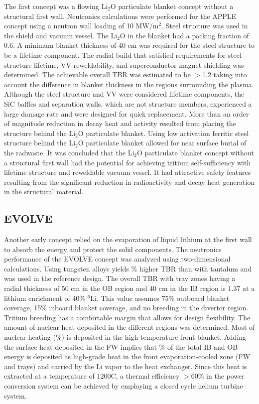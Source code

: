 The first concept was a flowing Li$_2$O particulate blanket concept without a
structural first wall.  Neutronics calculations were performed for the
\gls{APPLE} concept using a neutron wall loading of 10 MW/m$^2$. Steel
structure was used in the shield and vacuum vessel. The Li$_2$O in the blanket
had a packing fraction of 0.6. A minimum blanket thickness of 40 cm was
required for the steel structure to be a lifetime component. The radial build
that satisfied requirements for steel structure lifetime, \gls{VV} reweldability,
and superconductor magnet shielding was determined. The achievable overall TBR
was estimated to be $>$1.2 taking into account the difference in blanket
thickness in the regions surrounding the plasma. Although the steel structure
and \gls{VV} were considered lifetime components, the SiC baffles and separation
walls, which are not structure members, experienced a large damage rate and
were designed for quick replacement. More than an order of magnitude reduction
in decay heat and activity resulted from placing the structure behind the
Li$_2$O particulate blanket. Using low activation ferritic steel structure
behind the Li$_2$O particulate blanket allowed for near surface burial of the
radwaste.  It was concluded that the Li$_2$O particulate blanket concept
without a structural first wall had the potential for achieving tritium
self-sufficiency with lifetime structure and reweldable vacuum vessel.  It had
attractive safety features resulting from the significant reduction in
radioactivity and decay heat generation in the structural
material.

\subsection{\acrfull{EVOLVE}}

Another early concept relied on the evaporation of liquid lithium at the first
wall to absorb the energy and protect the solid components.  The neutronics
performance of the EVOLVE concept was analyzed using two-dimensional
calculations. Using tungsten alloys yields \% higher TBR than
with tantalum and was used in the reference design. The overall TBR with tray
zones having a radial thickness of 50 cm in the \gls{OB} region and 40 cm in
the \gls{IB} region is 1.37 at a lithium enrichment of 40\% $^6$Li. This value
assumes 75\% outboard blanket coverage, 15\% inboard blanket coverage, and no
breeding in the divertor region. Tritium breeding has a comfortable margin
that allows for design flexibility. The amount of nuclear heat deposited in
the different regions was determined. Most of nuclear heating (\%) is deposited in the high temperature front blanket. Adding the surface
heat deposited in the \gls{FW} implies that \% of the total
\gls{IB} and \gls{OB} energy is deposited as high-grade heat in the front
evaporation-cooled zone (\gls{FW} and trays) and carried by the Li vapor to
the heat exchanger. Since this heat is extracted at a temperature of 1200\textdegree C, a
thermal efficiency $>$60\% in the power conversion system can be achieved by
employing a closed cycle helium turbine system.


